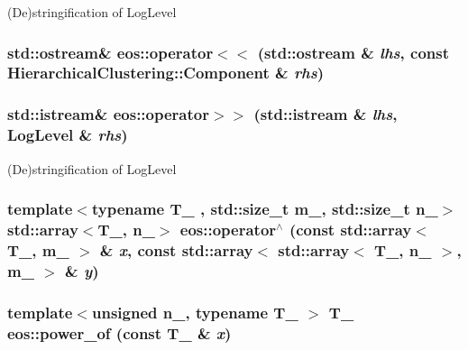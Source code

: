 \label{namespaceeos_a397c7661ab7dbc53ad04d52cd371c8aa}
(De)stringification of LogLevel \hypertarget{namespaceeos_a2d7ef50009f9368c73d5056eab3ec21d}{
\subsubsection[{operator$<$$<$}]{\setlength{\rightskip}{0pt plus 5cm}std::ostream\& eos::operator$<$$<$ (std::ostream \& {\em lhs}, \/  const HierarchicalClustering::Component \& {\em rhs})}}
\label{namespaceeos_a2d7ef50009f9368c73d5056eab3ec21d}
\hypertarget{namespaceeos_a28eec37f82312fce69a8c2b08b272ef9}{
\subsubsection[{operator$>$$>$}]{\setlength{\rightskip}{0pt plus 5cm}std::istream\& eos::operator$>$$>$ (std::istream \& {\em lhs}, \/  LogLevel \& {\em rhs})}}
\label{namespaceeos_a28eec37f82312fce69a8c2b08b272ef9}
(De)stringification of LogLevel \hypertarget{namespaceeos_a6d8071776e060cb58300bc883d5510b7}{
\subsubsection[{operator$^\wedge$}]{\setlength{\rightskip}{0pt plus 5cm}template$<$typename T\_\- , std::size\_\-t m\_\-, std::size\_\-t n\_\-$>$ std::array$<$T\_\-, n\_\-$>$ eos::operator$^\wedge$ (const std::array$<$ T\_\-, m\_\- $>$ \& {\em x}, \/  const std::array$<$ std::array$<$ T\_\-, n\_\- $>$, m\_\- $>$ \& {\em y})}}
\label{namespaceeos_a6d8071776e060cb58300bc883d5510b7}
\hypertarget{namespaceeos_a89d53e5e358a7428b14c811668193e3f}{
\subsubsection[{power\_\-of}]{\setlength{\rightskip}{0pt plus 5cm}template$<$unsigned n\_\-, typename T\_\- $>$ T\_\- eos::power\_\-of (const T\_\- \& {\em x})}}
\label{namespaceeos_a89d53e5e358a7428b14c811668193e3f}
